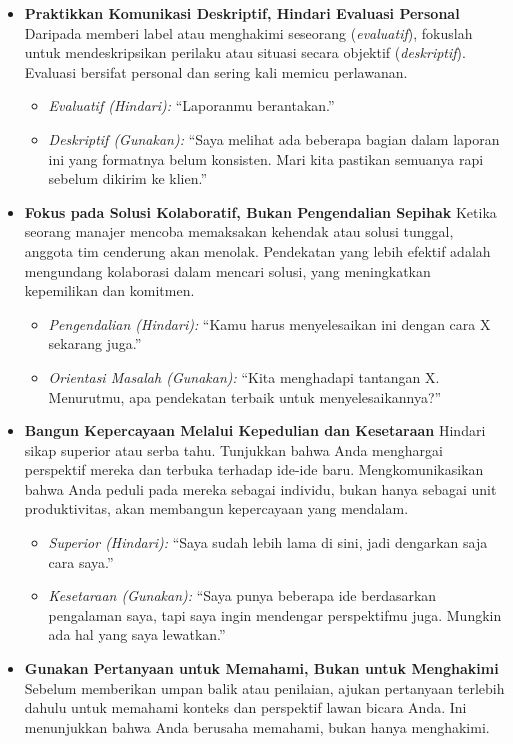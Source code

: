 \documentclass[
  letterpaper,
  DIV=11,
  numbers=noendperiod]{scrreprt}
\begin{document}
\begin{itemize}
\item
  \textbf{Praktikkan Komunikasi Deskriptif, Hindari Evaluasi Personal}
  Daripada memberi label atau menghakimi seseorang (\emph{evaluatif}),
  fokuslah untuk mendeskripsikan perilaku atau situasi secara objektif
  (\emph{deskriptif}). Evaluasi bersifat personal dan sering kali memicu
  perlawanan.

  \begin{itemize}
  \item
    \emph{Evaluatif (Hindari):} ``Laporanmu berantakan.''
  \item
    \emph{Deskriptif (Gunakan):} ``Saya melihat ada beberapa bagian
    dalam laporan ini yang formatnya belum konsisten. Mari kita pastikan
    semuanya rapi sebelum dikirim ke klien.''
  \end{itemize}
\item
  \textbf{Fokus pada Solusi Kolaboratif, Bukan Pengendalian Sepihak}
  Ketika seorang manajer mencoba memaksakan kehendak atau solusi
  tunggal, anggota tim cenderung akan menolak. Pendekatan yang lebih
  efektif adalah mengundang kolaborasi dalam mencari solusi, yang
  meningkatkan kepemilikan dan komitmen.

  \begin{itemize}
  \item
    \emph{Pengendalian (Hindari):} ``Kamu harus menyelesaikan ini dengan
    cara X sekarang juga.''
  \item
    \emph{Orientasi Masalah (Gunakan):} ``Kita menghadapi tantangan X.
    Menurutmu, apa pendekatan terbaik untuk menyelesaikannya?''
  \end{itemize}
\item
  \textbf{Bangun Kepercayaan Melalui Kepedulian dan Kesetaraan} Hindari
  sikap superior atau serba tahu. Tunjukkan bahwa Anda menghargai
  perspektif mereka dan terbuka terhadap ide-ide baru. Mengkomunikasikan
  bahwa Anda peduli pada mereka sebagai individu, bukan hanya sebagai
  unit produktivitas, akan membangun kepercayaan yang mendalam.

  \begin{itemize}
  \item
    \emph{Superior (Hindari):} ``Saya sudah lebih lama di sini, jadi
    dengarkan saja cara saya.''
  \item
    \emph{Kesetaraan (Gunakan):} ``Saya punya beberapa ide berdasarkan
    pengalaman saya, tapi saya ingin mendengar perspektifmu juga.
    Mungkin ada hal yang saya lewatkan.''
  \end{itemize}
\item
  \textbf{Gunakan Pertanyaan untuk Memahami, Bukan untuk Menghakimi}
  Sebelum memberikan umpan balik atau penilaian, ajukan pertanyaan
  terlebih dahulu untuk memahami konteks dan perspektif lawan bicara
  Anda. Ini menunjukkan bahwa Anda berusaha memahami, bukan hanya
  menghakimi.


\end{itemize}
\end{document}
